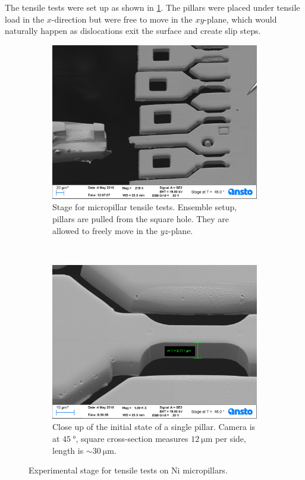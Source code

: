 The tensile tests were set up as shown in \cref{f:expSetup}. The pillars were placed under tensile load in the $x$-direction but were free to move in the $xy$-plane, which would naturally happen as dislocations exit the surface and create slip steps.
\begin{figure}
    \centering
    \begin{subfigure}[t]{0.45\linewidth}
        \includegraphics[width=\linewidth]{../data/Ni024.jpg}
        \caption[Stage for micropillar tensile tests.]{Stage for micropillar tensile tests. Ensemble setup, pillars are pulled from the square hole. They are allowed to freely move in the $yz$-plane.}
    \end{subfigure}
    ~
    \begin{subfigure}[t]{0.45\linewidth}
        \centering
        \includegraphics[width=\linewidth]{../data/Ni000.jpg}
        \caption[Close up of the initial state of a single pillar.]{Close up of the initial state of a single pillar. Camera is at $\SI{45}{\degree}$, square cross-section measures $\SI{12}{\micro\metre}$ per side, length is $\sim \SI{30}{\micro\metre}$.}
    \end{subfigure}
    \caption{Experimental stage for tensile tests on Ni micropillars.}
    \label{f:expSetup}
\end{figure}

